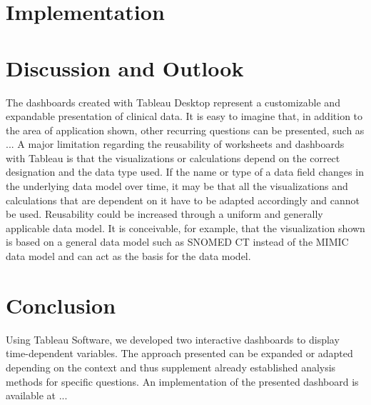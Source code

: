 \documentclass[aac,crcready]{iosart2x}
\begin{document}
\section{Implementation}\label{s4}



\section{Discussion and Outlook}\label{s5}
The dashboards created with Tableau Desktop represent a customizable and expandable presentation of clinical data. It is easy to imagine that, in addition to the area of application shown, other recurring questions can be presented, such as ...
A major limitation regarding the reusability of worksheets and dashboards with Tableau is that the visualizations or calculations depend on the correct designation and the data type used. If the name or type of a data field changes in the underlying data model over time, it may be that all the visualizations and calculations that are dependent on it have to be adapted accordingly and cannot be used. Reusability could be increased through a uniform and generally applicable data model. It is conceivable, for example, that the visualization shown is based on a general data model such as SNOMED CT instead of the MIMIC data model and can act as the basis for the data model.

\section{Conclusion}\label{s6}
Using Tableau Software, we developed two interactive dashboards to display time-dependent variables. The approach presented can be expanded or adapted depending on the context and thus supplement already established analysis methods for specific questions. An implementation of the presented dashboard is available at ...




\end{document}
